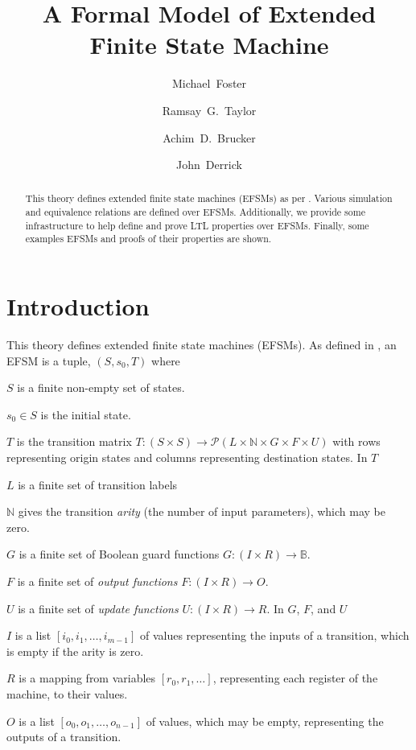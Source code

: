 \documentclass[10pt,DIV16,a4paper,abstract=true,twoside=semi,openright]{scrreprt}
\title{A Formal Model of Extended Finite State Machine}%
\author{Michael~Foster\orcidID{0000-0001-8233-9873} \and
 Ramsay~G.~Taylor\orcidID{0000-0002-4036-7590} \and
 Achim~D.~Brucker\orcidID{0000-0002-6355-1200} \and
 John~Derrick\orcidID{0000-0002-6631-8914}}
\newcommand\mydescriptionlabel[1]{\hspace{\leftmargini}\textbf{#1}}
\newenvironment{where}{%
  \let\descriptionlabel\mydescriptionlabel
  \description[itemsep=0em, font=\normalfont]
}{%
  \enddescription
}
\begin{document}
\maketitle
\begin{abstract}
  This theory defines extended finite state machines (EFSMs) as per \cite{foster2018}. Various simulation and equivalence relations are defined over EFSMs. Additionally, we provide some infrastructure to help define and prove LTL properties over EFSMs. Finally, some examples EFSMs and proofs of their properties are shown.

  \begin{quote}
    \bigskip
  \end{quote}
\end{abstract}


\tableofcontents
\cleardoublepage

\chapter{Introduction}
This theory defines extended finite state machines (EFSMs). As defined in \cite{foster2018}, an EFSM is a tuple, $(S, s_0, T)$ where
\begin{where}
  \item [$S$] is a finite non-empty set of states.
  \item [$s_0 \in S$]is the initial state.
  \item [$T$] is the transition matrix $T:(S \times S) \to \mathcal{P}(L \times \mathbb{N} \times G \times F \times U)$ with rows representing origin states and columns representing destination states.
\end{where}
In $T$
\begin{where}
  \item [$L$] is a finite set of transition labels
  \item [$\mathbb{N}$] gives the transition \emph{arity} (the number of input parameters), which may be zero.
  \item [$G$] is a finite set of Boolean guard functions $G:(I \times R) \to \mathbb{B}$.
  \item [$F$] is a finite set of \emph{output functions} $F:(I \times R) \to O$.
  \item [$U$] is a finite set of \emph{update functions} $U:(I \times R) \to R$.
\end{where}
In $G$, $F$, and $U$
\begin{where}
  \item [$I$] is a list $[i_0, i_1, \ldots, i_{m-1}]$ of values representing the inputs of a transition, which is empty if the arity is zero.
  \item [$R$] is a mapping from variables $[r_0, r_1, \ldots]$, representing each register of the machine, to their values.
  \item [$O$] is a list $[o_0, o_1, \ldots, o_{n-1}]$ of values, which may be empty, representing the outputs of a transition.
\end{where}
\end{document}
